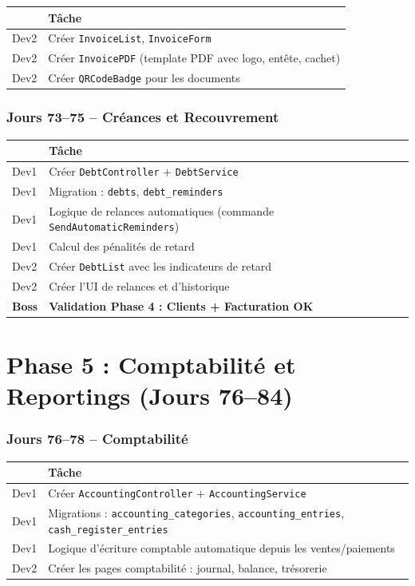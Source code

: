 \documentclass[12pt,a4paper]{report}
\begin{document}
\begin{tabularx}{\textwidth}{l X}
    \toprule
    & \textbf{Tâche} \\
    \midrule
    Dev2 & Créer \texttt{InvoiceList}, \texttt{InvoiceForm} \\
    Dev2 & Créer \texttt{InvoicePDF} (template PDF avec logo, entête, cachet) \\
    Dev2 & Créer \texttt{QRCodeBadge} pour les documents \\
    \bottomrule
\end{tabularx}

\subsection*{Jours 73--75 -- Créances et Recouvrement}

\begin{tabularx}{\textwidth}{l X}
    \toprule
    & \textbf{Tâche} \\
    \midrule
    Dev1 & Créer \texttt{DebtController} + \texttt{DebtService} \\
    Dev1 & Migration : \texttt{debts}, \texttt{debt\_reminders} \\
    Dev1 & Logique de relances automatiques (commande \texttt{SendAutomaticReminders}) \\
    Dev1 & Calcul des pénalités de retard \\
    Dev2 & Créer \texttt{DebtList} avec les indicateurs de retard \\
    Dev2 & Créer l'UI de relances et d'historique \\
    \textbf{Boss} & \textbf{Validation Phase 4 : Clients + Facturation OK} \\
    \bottomrule
\end{tabularx}

\chapter{Phase 5 : Comptabilité et Reportings (Jours 76--84)}

\subsection*{Jours 76--78 -- Comptabilité}

\begin{tabularx}{\textwidth}{l X}
    \toprule
    & \textbf{Tâche} \\
    \midrule
    Dev1 & Créer \texttt{AccountingController} + \texttt{AccountingService} \\
    Dev1 & Migrations : \texttt{accounting\_categories}, \texttt{accounting\_entries}, \texttt{cash\_register\_entries} \\
    Dev1 & Logique d'écriture comptable automatique depuis les ventes/paiements \\
    Dev2 & Créer les pages comptabilité : journal, balance, trésorerie \\
    \bottomrule
\end{tabularx}
\end{document}
